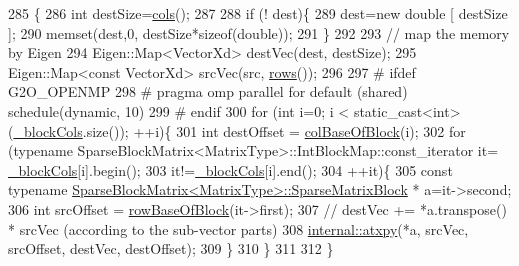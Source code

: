 \begin{DoxyCode}
285                                                                                           \{
286     \textcolor{keywordtype}{int} destSize=\hyperlink{classg2o_1_1SparseBlockMatrix_ab854ca59f370d93229852e32a7b49d3e}{cols}();
287 
288     \textcolor{keywordflow}{if} (! dest)\{
289       dest=\textcolor{keyword}{new} \textcolor{keywordtype}{double} [ destSize ];
290       memset(dest,0, destSize*\textcolor{keyword}{sizeof}(\textcolor{keywordtype}{double}));
291     \}
292 
293     \textcolor{comment}{// map the memory by Eigen}
294     Eigen::Map<VectorXd> destVec(dest, destSize);
295     Eigen::Map<const VectorXd> srcVec(src, \hyperlink{classg2o_1_1SparseBlockMatrix_adf18fb267e545b9036314cf9f8f10473}{rows}());
296 
297 \textcolor{preprocessor}{#   ifdef G2O\_OPENMP}
298 \textcolor{preprocessor}{#   pragma omp parallel for default (shared) schedule(dynamic, 10)}
299 \textcolor{preprocessor}{#   endif}
300     \textcolor{keywordflow}{for} (\textcolor{keywordtype}{int} i=0; i < static\_cast<int>(\hyperlink{classg2o_1_1SparseBlockMatrix_ae236d56a01ba4d292450a518621b41f8}{\_blockCols}.size()); ++i)\{
301       \textcolor{keywordtype}{int} destOffset = \hyperlink{classg2o_1_1SparseBlockMatrix_adf282a20d7c77c5949a0d93ca2651271}{colBaseOfBlock}(i);
302       \textcolor{keywordflow}{for} (\textcolor{keyword}{typename} SparseBlockMatrix<MatrixType>::IntBlockMap::const\_iterator it=
      \hyperlink{classg2o_1_1SparseBlockMatrix_ae236d56a01ba4d292450a518621b41f8}{\_blockCols}[i].begin(); 
303           it!=\hyperlink{classg2o_1_1SparseBlockMatrix_ae236d56a01ba4d292450a518621b41f8}{\_blockCols}[i].end(); 
304           ++it)\{
305         \textcolor{keyword}{const} \textcolor{keyword}{typename} \hyperlink{classg2o_1_1SparseBlockMatrix_ab2f7376cbf055803fda6527dcc43e3be}{SparseBlockMatrix<MatrixType>::SparseMatrixBlock}
      * a=it->second;
306         \textcolor{keywordtype}{int} srcOffset = \hyperlink{classg2o_1_1SparseBlockMatrix_a176a2dbe00711e248ea25dc1995c6b4c}{rowBaseOfBlock}(it->first);
307         \textcolor{comment}{// destVec += *a.transpose() * srcVec (according to the sub-vector parts)}
308         \hyperlink{namespaceg2o_1_1internal_ad176878dff85b91f1dbabed52cbf696e}{internal::atxpy}(*a, srcVec, srcOffset, destVec, destOffset);
309       \}
310     \}
311     
312   \}
\end{DoxyCode}
